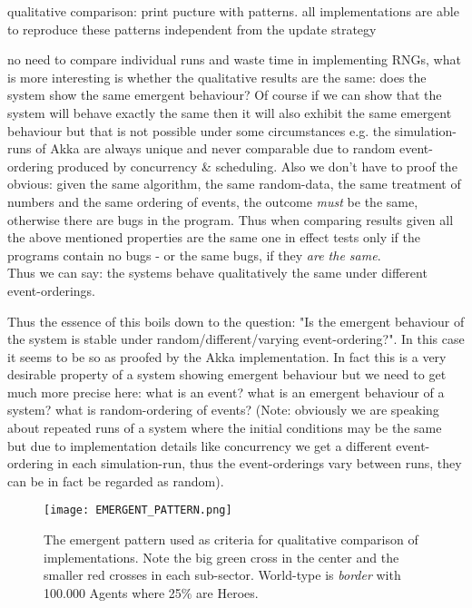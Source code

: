 qualitative comparison: print pucture with patterns. all implementations are able to reproduce these patterns independent from the update strategy

no need to compare individual runs and waste time in implementing RNGs, what is more interesting is whether the qualitative results are the same: does the system show the same emergent behaviour? Of course if we can show that the system will behave exactly the same then it will also exhibit the same emergent behaviour but that is not possible under some circumstances e.g. the simulation-runs of Akka are always unique and never comparable due to random event-ordering produced by concurrency \& scheduling. Also we don't have to proof the obvious: given the same algorithm, the same random-data, the same treatment of numbers and the same ordering of events, the outcome \textit{must} be the same, otherwise there are bugs in the program. Thus when comparing results given all the above mentioned properties are the same one in effect tests only if the programs contain no bugs - or the same bugs, if they \textit{are the same}. \\

Thus we can say: the systems behave qualitatively the same under different event-orderings.

Thus the essence of this boils down to the question: "Is the emergent behaviour of the system is stable under random/different/varying event-ordering?". In this case it seems to be so as proofed by the Akka implementation. In fact this is a very desirable property of a system showing emergent behaviour but we need to get much more precise here: what is an event? what is an emergent behaviour of a system? what is random-ordering of events? (Note: obviously we are speaking about repeated runs of a system where the initial conditions may be the same but due to implementation details like concurrency we get a different event-ordering in each simulation-run, thus the event-orderings vary between runs, they can be in fact be regarded as random).

\begin{figure}[H]
	\centering
  \texttt{[image: EMERGENT\_PATTERN.png]}
  	\caption{The emergent pattern used as criteria for qualitative comparison of implementations. Note the big green cross in the center and the smaller red crosses in each sub-sector. World-type is \textit{border} with 100.000 Agents where 25\% are Heroes.}
	\label{fig:EMERGENT_PATTERN}
\end{figure}


